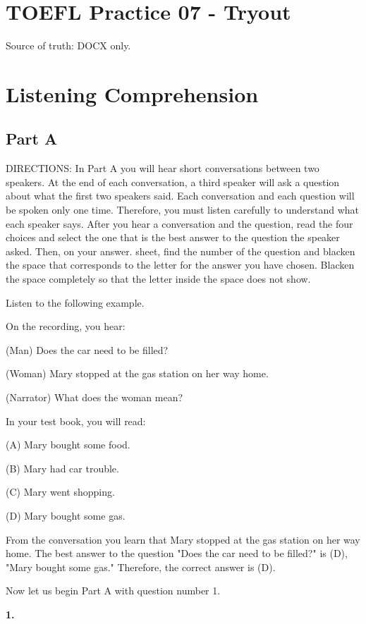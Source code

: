 \documentclass[12pt]{article}
\begin{document}
\section*{TOEFL Practice 07 - Tryout}
Source of truth: DOCX only.
\section*{Listening Comprehension}
\subsection*{Part A}
DIRECTIONS: In Part A you will hear short conversations between two speakers. At the end of each conversation, a third speaker will ask a question about what the first two speakers said. Each conversation and each question will be spoken only one time. Therefore, you must listen carefully to understand what each speaker says. After you hear a conversation and the question, read the four choices and select the one that is the best answer to the question the speaker asked. Then, on your answer. sheet, find the number of the question and blacken the space that corresponds to the letter for the answer you have chosen. Blacken the space completely so that the letter inside the space does not show.\par
\begin{exampleblock}
Listen to the following example.\par
On the recording, you hear:\par
(Man) Does the car need to be filled?\par
(Woman) Mary stopped at the gas station on her way home.\par
(Narrator) What does the woman mean?\par
In your test book, you will read:\par
(A) Mary bought some food.\par
(B) Mary had car trouble.\par
(C) Mary went shopping.\par
(D) Mary bought some gas.\par
From the conversation you learn that Mary stopped at the gas station on her way home. The best answer to the question "Does the car need to be filled?" is (D), "Mary bought some gas." Therefore, the correct answer is (D).\par
Now let us begin Part A with question number 1.\par
\end{exampleblock}
\noindent\textbf{1.}
\end{document}
